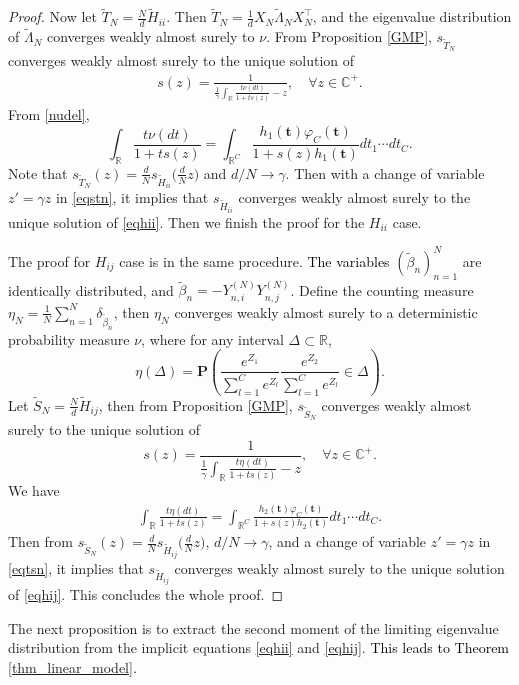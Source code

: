 \documentclass{article}
\newcommand{\mb}{\mathbb}
\newcommand\mf{\mathbf}
\newcommand{\wt}{\widetilde}
\newcommand{\rw}{\rightarrow}
\newcommand{\1}{^{(1)}}
\newcommand{\2}{^{(2)}}
\renewcommand{\l}{\left}
\renewcommand{\r}{\right}
\newcommand{\bea}{\begin{equation}\begin{aligned}}
\newcommand{\eea}{\end{aligned}\end{equation}}
\newcommand{\zhaoruirevise}[1]{\textcolor{black}{ #1}}
\begin{document}
\begin{proof}
Now let $\wt{T}_N=\frac{N}{d}\wt{H}_{ii}$. Then $\wt{T}_N=\frac{1}{d}X_N\wt{\Lambda}_NX_N^\top$, and the eigenvalue distribution of $\wt{\Lambda}_N$ converges weakly almost surely to $\nu$. From Proposition \ref{GMP}, $s_{\wt{T}_N}$ converges weakly almost surely to the unique solution of 
\bea\label{eqstn}
s(z)=\frac{1}{\frac{1}{\gamma}\int_{\mb{R}}\frac{t\nu(dt)}{1+ts(z)}-z},\quad \forall z\in \mb{C}^+.
\eea
From \eqref{nudel}, 
$$
\int_\mb{R} \frac{t\nu(dt)}{1+ts(z)}=\int_{\mb{R}^C} \frac{h_1(\mf{t})\varphi_C(\mf{t})}{1+ s(z)h_1(\mf{t})}
 dt_1\cdots dt_C.
$$
Note that $s_{\wt{T}_N}(z)=\frac{d}{N}s_{\wt{H}_{ii}}\Big(\frac{d}{N}z\Big)$ and $d/N\rw \gamma$. Then with a change of variable $z'=\gamma z$ in \eqref{eqstn}, it implies that $s_{\wt{H}_{ii}}$ converges weakly almost surely to the unique solution of \eqref{eqhii}. Then we finish the proof for the $H_{ii}$ case. 

The proof for $H_{ij}$ case is in the same procedure. \zhaoruirevise{The variables} $(\wt{\beta}_n)_{n=1}^N$ are identically distributed, and
$\wt{\beta}_n=-Y_{n,i}^{(N)}Y_{n,j}^{(N)}$. Define the counting measure $\eta_N=\frac{1}{N}\sum_{n=1}^N\delta_{\wt{\beta}_n}$, then $\eta_N$ converges weakly almost surely to a deterministic probability measure $\nu$, where for any interval $\Delta\subset\mb{R}$,
$$
\eta(\Delta)=\mf{P}\l(\frac{e^{Z_1}}{\sum_{l=1}^C e^{Z_l}}\frac{e^{Z_2}}{\sum_{l=1}^C e^{Z_l}}\in \Delta\r).
$$
Let $\wt{S}_N=\frac{N}{d}\wt{H}_{ij}$, then from Proposition \ref{GMP}, $s_{\wt{S}_N}$ converges weakly almost surely to the unique solution of 
$$
s(z)=\frac{1}{\frac{1}{\gamma}\int_{\mb{R}}\frac{t\eta(dt)}{1+ts(z)}-z},\quad \forall z\in \mb{C}^+.
$$
We have
\bea\label{eqtsn}
\int_\mb{R} \frac{t\eta(dt)}{1+ts(z)}=\int_{\mb{R}^C} \frac{h_2(\mf{t})\varphi_C(\mf{t})}{1+s(z)h_2(\mf{t})}
 dt_1\cdots dt_C.
\eea
Then from $s_{\wt{S}_N}(z)=\frac{d}{N}s_{\wt{H}_{ij}}\Big(\frac{d}{N}z\Big)$, $d/N\rw \gamma$, and a change of variable $z'=\gamma z$ in \eqref{eqtsn}, it implies that $s_{\wt{H}_{ij}}$ converges weakly almost surely to the unique solution of \eqref{eqhij}. This concludes the whole proof.
\end{proof}

The next proposition is to extract the second moment of the limiting eigenvalue distribution from the implicit equations \eqref{eqhii} and \eqref{eqhij}. \zhaoruirevise{This leads to Theorem \ref{thm_linear_model}.}
\end{document}
